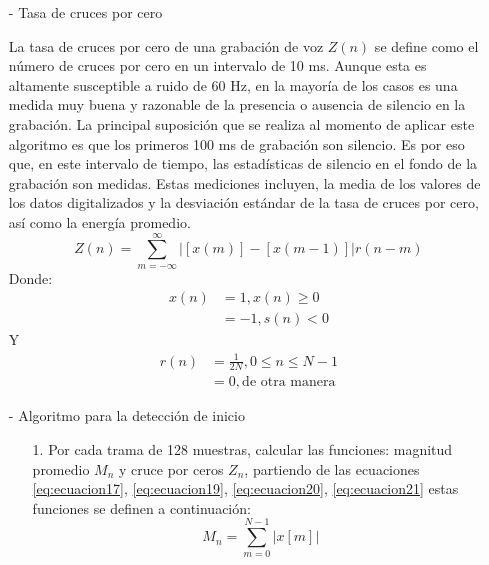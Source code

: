\begin{enumerate}
\begin{enumerate}
\begin{enumerate}
\item[-]Tasa de cruces por cero
\par
La tasa de cruces por cero de una grabación de voz $Z(n)$ se define como el número de cruces por cero en un intervalo de 10 ms. Aunque esta es altamente susceptible a ruido de 60 Hz, en la mayoría de los casos es una medida muy buena y razonable de la presencia o ausencia de silencio en la grabación.
\vskip 0.5cm
La principal suposición que se realiza al momento de aplicar este algoritmo es que los primeros 100 ms de grabación son silencio. Es por eso que, en este intervalo de tiempo, las estadísticas de silencio en el fondo de la grabación son medidas. Estas mediciones incluyen, la media de los valores de los datos digitalizados y la desviación estándar de la tasa de cruces por cero, así como la energía promedio.
\begin{equation}
\label{eq:ecuacion19}
Z(n) = \sum_{m=-\infty}^{\infty}\left | [x(m)] - [x(m-1)] \right |r(n-m)
\end{equation}
Donde:
\begin{equation}
\label{eq:ecuacion20}
\begin{split}
x(n)&= 1, x(n) \geq 0 \\ 
 &= -1, s(n) < 0
\end{split}
\end{equation}
Y
\begin{equation}
\label{eq:ecuacion21}
\begin{split}
r(n)&= \frac{1}{2N}, 0 \leq n \leq N-1 \\
 &= 0, \text{de otra manera}
\end{split}
\end{equation}
\vskip 0.2cm
\item[-]Algoritmo para la detección de inicio
\par
\begin{enumerate}
\item[1.]Por cada trama de 128 muestras, calcular las funciones: magnitud promedio $M_{n}$ y cruce por ceros $Z_{n}$, partiendo de las ecuaciones \eqref{eq:ecuacion17}, \eqref{eq:ecuacion19}, \eqref{eq:ecuacion20}, \eqref{eq:ecuacion21} estas funciones se definen a continuación: 
\begin{equation}
\label{eq:ecuacion22}
M_{n} = \sum_{m=0}^{N-1}\left | x[m] \right |
\end{equation}


\end{enumerate}
\end{enumerate}
\end{enumerate}
\end{enumerate}
